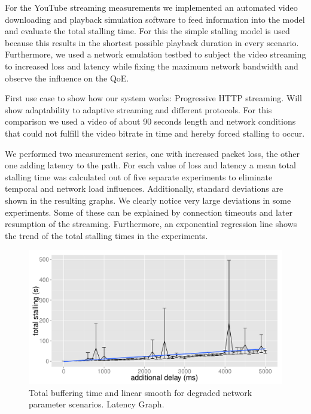 For the YouTube streaming measurements we implemented an automated video downloading and playback simulation software to feed information into the model and evaluate the total stalling time. For this the simple stalling model is used because this results in the shortest possible playback duration in every scenario. Furthermore, we used a network emulation testbed to subject the video streaming to increased loss and latency while fixing the maximum network bandwidth and observe the influence on the QoE.

First use case to show how our system works: Progressive HTTP streaming. Will show adaptability to adaptive streaming and different protocols. For this comparison we used a video of about 90 seconds length and network conditions that could not fulfill the video bitrate in time and hereby forced stalling to occur.

We performed two measurement series, one with increased packet loss, the other one adding latency to the path. For each value of loss and latency a mean total stalling time was calculated out of five separate experiments to eliminate temporal and network load influences. Additionally, standard deviations are shown in the resulting graphs. We clearly notice very large deviations in some experiments. Some of these can be explained by connection timeouts and later resumption of the streaming. Furthermore, an exponential regression line shows the trend of the total stalling times in the experiments.

\begin{figure}[htbp]
    \centering
    \includegraphics[width=\textwidth]{images/R-delayseries.pdf}
    \caption{Total buffering time and linear smooth for degraded network parameter scenarios. Latency Graph.}
    \label{c3:fig:delayseries}
\end{figure}

